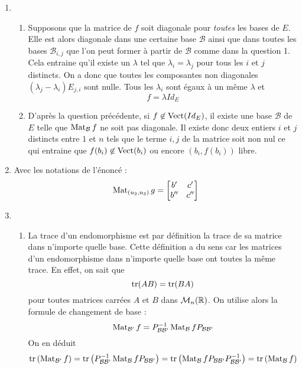 \begin{enumerate}
\item \begin{enumerate}
 \item Supposons que la matrice de $f$ soit diagonale pour \emph{toutes} les bases de $E$. Elle est alors diagonale dans une certaine base $\mathcal B$ ainsi que dans toutes les bases $\mathcal B_{i,j}$ que l'on peut former à partir de $\mathcal B$ comme dans la question 1. Cela entraine qu'il existe un $\lambda$ tel que  $\lambda_i=\lambda_j$ pour tous les $i$ et $j$ distincts. On a donc que toutes les composantes non diagonales $(\lambda_j - \lambda_i)E_{j,i}$ sont nulle. Tous les $\lambda_i$ sont égaux à un même $\lambda$ et
\begin{displaymath}
 f = \lambda Id_E
\end{displaymath}

\item D'après la question précédente, si $f\not \in \operatorname{Vect} (Id_E)$, il existe une base $\mathcal B$ de $E$ telle que $\operatorname{Mat}_{\mathcal B}f$ ne soit pas diagonale. Il existe donc deux entiers $i$ et $j$ distincts entre $1$ et $n$ tels que le terme $i,j$ de la matrice soit non nul ce qui entraine que $f(b_i)\not\in \operatorname{Vect}(b_i)$ ou encore $(b_i,f(b_i))$ libre.
\end{enumerate}

\item Avec les notations de l'énoncé :
\begin{displaymath}
 \operatorname{Mat}_{(u_2,u_3)} g =
\begin{bmatrix}
 b' & c' \\
b'' & c''
\end{bmatrix}
\end{displaymath}

\item \begin{enumerate}
 \item La trace d'un endomorphisme est par définition la trace de sa matrice dans n'importe quelle base. Cette définition a du sens car les matrices d'un endomorphisme dans n'importe quelle base ont toutes la même trace. En effet, on sait que 
\begin{displaymath}
 \operatorname{tr} (AB) = \operatorname{tr} (BA)
\end{displaymath}
pour toutes matrices carrées $A$ et $B$ dans $\mathcal M_n(\mathbb{R})$. On utilise alors la formule de changement de base :
\begin{displaymath}
 \operatorname{Mat}_{\mathcal B'} f = P_{\mathcal B \mathcal B'}^{-1} \operatorname{Mat}_\mathcal B f P_{\mathcal B \mathcal B'}
\end{displaymath}
On en déduit 
\begin{displaymath}
\operatorname{tr}\left(  \operatorname{Mat}_{\mathcal B'} f\right)  = \operatorname{tr} \left( P_{\mathcal B \mathcal B'}^{-1} \operatorname{Mat}_\mathcal B f P_{\mathcal B \mathcal B'}\right) 
=\operatorname{tr}\left(\operatorname{Mat}_\mathcal B f P_{\mathcal B \mathcal B'} P_{\mathcal B \mathcal B'}^{-1}\right) 
=\operatorname{tr}\left(\operatorname{Mat}_\mathcal B f \right) 
\end{displaymath}


\end{enumerate}
\end{enumerate}

